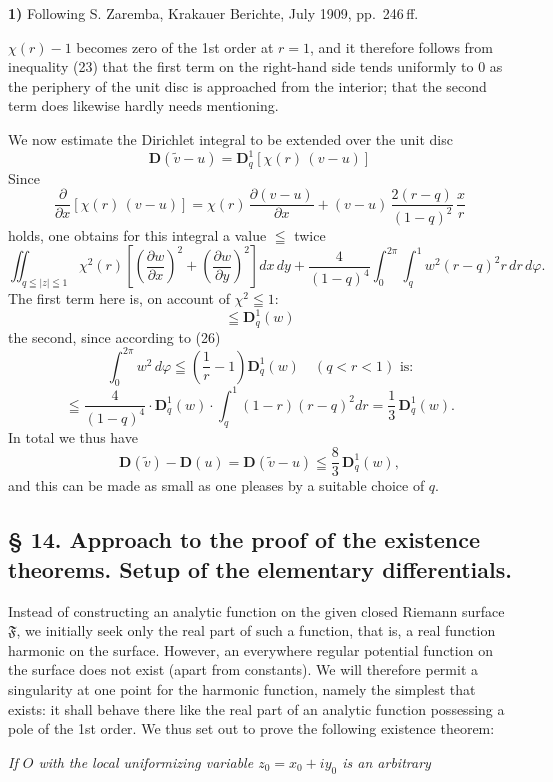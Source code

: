 \documentclass{article}
\begin{document}
\textbf{1)} Following S. Zaremba, Krakauer Berichte, July 1909, pp.~246\,ff.

$\chi(r) - 1$ becomes zero of the 1st order at $r = 1$, and it therefore follows from inequality (23) that the first term on the right-hand side tends uniformly to $0$ as the periphery of the unit disc is approached from the interior; that the second term does likewise hardly needs mentioning.

We now estimate the Dirichlet integral to be extended over the unit disc
\[ \mathbf{D}(\tilde{v} - u) = \mathbf{D}_q^1 [\chi(r)\,(v - u)] \]
Since
\[ \frac{\partial}{\partial x}[\chi(r)\,(v - u)] = \chi(r)\,\frac{\partial(v - u)}{\partial x} + (v - u)\,\frac{2(r - q)}{(1 - q)^2}\,\frac{x}{r} \]
holds, one obtains for this integral a value $\leqq$ twice
\[ \iint_{q \leqq |z| \leqq 1} \chi^2(r) \left[ \left(\frac{\partial w}{\partial x}\right)^2 + \left(\frac{\partial w}{\partial y}\right)^2 \right] dx\,dy + \frac{4}{(1 - q)^4} \int_0^{2\pi} \int_q^1 w^2(r - q)^2 r\,dr\,d\varphi. \]
The first term here is, on account of $\chi^2 \leqq 1$:
\[ \leqq \mathbf{D}_q^1(w) \]
the second, since according to (26)
\[ \int_0^{2\pi} w^2\,d\varphi \leqq \left(\frac{1}{r} - 1\right) \mathbf{D}_q^1(w) \quad (q < r < 1)\text{ is:} \]
\[ \leqq \frac{4}{(1 - q)^4} \cdot \mathbf{D}_q^1(w) \cdot \int_q^1 (1 - r)(r - q)^2 dr = \frac{1}{3}\,\mathbf{D}_q^1(w). \]
In total we thus have
\[ \mathbf{D}(\tilde{v}) - \mathbf{D}(u) = \mathbf{D}(\tilde{v} - u) \leqq \frac{8}{3}\,\mathbf{D}_q^1(w), \]
and this can be made as small as one pleases by a suitable choice of $q$.

\subsection*{§ 14. Approach to the proof of the existence theorems. Setup of the elementary differentials.}

Instead of constructing an analytic function on the given closed Riemann surface $\mathfrak{F}$, we initially seek only the real part of such a function, that is, a real function harmonic on the surface. However, an everywhere regular potential function on the surface does not exist (apart from constants). We will therefore permit a singularity at one point for the harmonic function, namely the simplest that exists: it shall behave there like the real part of an analytic function possessing a pole of the 1st order. We thus set out to prove the following existence theorem:

\emph{If $O$ with the local uniformizing variable $z_0 = x_0 + i y_0$ is an arbitrary}
\end{document}
